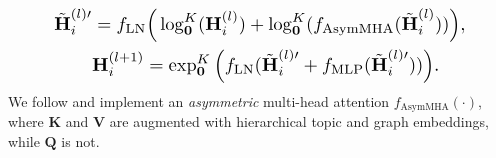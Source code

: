 \begin{equation}
\resizebox{0.88\columnwidth}{!}{
$ \begin{split}
    \tilde{\textbf{H}}_i^{(l)\prime}&=f_{\text{LN}}\Big(\log_{\textbf{0}}^K(\textbf{H}_i^{(l)})+\log_{\textbf{0}}^K(f_{\text{AsymMHA}}(\tilde{\textbf{H}}_i^{(l)}))\Big),\\
    &\textbf{H}_i^{(l+1)}=\exp_{\textbf{0}}^K\Big(f_{\text{LN}}(\tilde{\textbf{H}}_i^{(l)\prime}+f_{\text{MLP}}(\tilde{\textbf{H}}_i^{(l)\prime}))\Big).
\end{split} $
}
\end{equation}
We follow \cite{graphformers} and implement an \emph{asymmetric} multi-head attention $ f_{\text{AsymMHA}}(\cdot) $, where $ \textbf{K} $ and $ \textbf{V} $ are augmented with hierarchical topic and graph embeddings, while $ \textbf{Q} $ is not.

